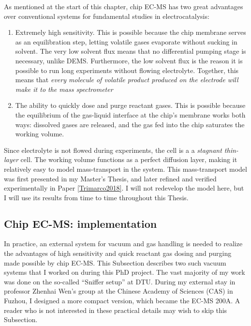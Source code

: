As mentioned at the start of this chapter, chip EC-MS has two great advantages over conventional systems for fundamental studies in electrocatalysis:

\begin{enumerate}
\item Extremely high sensitivity. This is possible because the chip membrane serves as an equilibration step, letting volatile gases evaporate without sucking in solvent. The very low solvent flux means that no differential pumping stage is necessary, unlike DEMS. Furthermore, the low solvent flux is the reason it is possible to run long experiments without flowing electrolyte. Together, this means that \textit{every molecule of volatile product produced on the electrode will make it to the mass spectrometer} 

\item The ability to quickly dose and purge reactant gases. This is possible because the equilibrium of the gas-liquid interface at the chip's membrane works both ways: dissolved gases are released, and the gas fed into the chip saturates the working volume.
\end{enumerate}

Since electrolyte is not flowed during experiments, the cell is a a \textit{stagnant thin-layer} cell. The working volume functions as a perfect diffusion layer, making it relatively easy to model mass-transport in the system. This mass-transport model was first presented in my Master's Thesis\cite{Scott2016_MSc}, and later refined and verified experimentally in Paper \ref{Trimarco2018}. I will not redevelop the model here, but I will use its results from time to time throughout this Thesis.

\subsection{Chip EC-MS: implementation}\label{subsec:setups}

In practice, an external system for vacuum and gas handling is needed to realize the advantages of high sensitivity and quick reactant gas dosing and purging made possible by chip EC-MS. This Subsection describes two such vacuum systems that I worked on during this PhD project. The vast majority of my work was done on the so-called ``Sniffer setup'' at DTU. During my external stay in professor Zhenhai Wen's group at the Chinese Academy of Sciences (CAS) in Fuzhou, I designed a more compact version, which became the EC-MS 200A. A reader who is not interested in these practical details may wish to skip this Subsection. 

